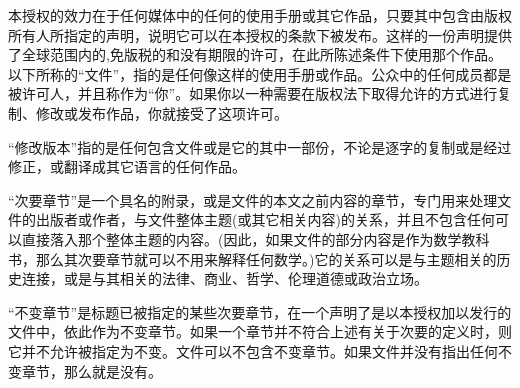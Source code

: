 本授权的效力在于任何媒体中的任何的使用手册或其它作品，只要其中包含由版权所有人所指定的声明，说明它可以在本授权的条款下被发布。这样的一份声明提供了全球范围内的,免版税的和没有期限的许可，在此所陈述条件下使用那个作品。以下所称的``文件''，指的是任何像这样的使用手册或作品。公众中的任何成员都是被许可人，并且称作为``你''。如果你以一种需要在版权法下取得允许的方式进行复制、修改或发布作品，你就接受了这项许可。


``修改版本''指的是任何包含文件或是它的其中一部份，不论是逐字的复制或是经过修正，或翻译成其它语言的任何作品。


``次要章节''是一个具名的附录，或是文件的本文之前内容的章节，专门用来处理文件的出版者或作者，与文件整体主题(或其它相关内容)的关系，并且不包含任何可以直接落入那个整体主题的内容。(因此，如果文件的部分内容是作为数学教科书，那么其次要章节就可以不用来解释任何数学。)它的关系可以是与主题相关的历史连接，或是与其相关的法律、商业、哲学、伦理道德或政治立场。


``不变章节''是标题已被指定的某些次要章节，在一个声明了是以本授权加以发行的文件中，依此作为不变章节。如果一个章节并不符合上述有关于次要的定义时，则它并不允许被指定为不变。文件可以不包含不变章节。如果文件并没有指出任何不变章节，那么就是没有。

